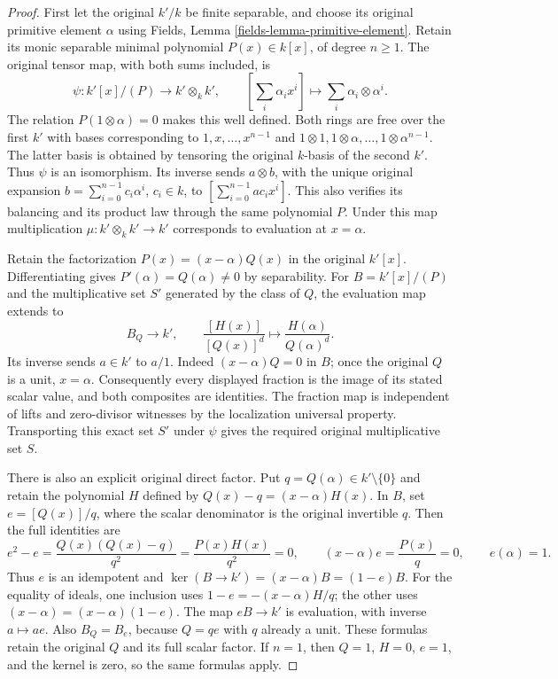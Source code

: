 \begin{proof}
First let the original $k'/k$ be finite
separable, and choose its original primitive
element $\alpha$ using Fields,
Lemma \ref{fields-lemma-primitive-element}.
Retain its monic separable minimal polynomial
$P(x)\in k[x]$, of degree $n\geq1$.
The original tensor map, with both sums
included, is
$$
\psi:k'[x]/(P)\longrightarrow k'\otimes_kk',
\qquad
\left[\sum_i\alpha_i x^i\right]
\longmapsto\sum_i\alpha_i\otimes\alpha^i.
$$
The relation $P(1\otimes\alpha)=0$ makes this
well defined. Both rings are free over the
first $k'$ with bases corresponding to
$1,x,\ldots,x^{n-1}$ and
$1\otimes1,1\otimes\alpha,\ldots,1\otimes\alpha^{n-1}$.
The latter basis is obtained by tensoring
the original $k$-basis of the second $k'$.
Thus $\psi$ is an isomorphism. Its inverse
sends $a\otimes b$, with the unique original
expansion $b=\sum_{i=0}^{n-1}c_i\alpha^i$,
$c_i\in k$, to $[\sum_{i=0}^{n-1}ac_i x^i]$.
This also verifies its balancing and its
product law through the same polynomial $P$.
Under this map multiplication
$\mu:k'\otimes_kk'\to k'$ corresponds to
evaluation at $x=\alpha$.

Retain the factorization $P(x)=(x-\alpha)Q(x)$
in the original $k'[x]$. Differentiating gives
$P'(\alpha)=Q(\alpha)\ne0$ by separability.
For $B=k'[x]/(P)$ and the multiplicative set
$S'$ generated by the class of $Q$, the
evaluation map extends to
$$
B_Q\longrightarrow k',\qquad
\frac{[H(x)]}{[Q(x)]^d}\longmapsto
\frac{H(\alpha)}{Q(\alpha)^d}.
$$
Its inverse sends $a\in k'$ to $a/1$.
Indeed $(x-\alpha)Q=0$ in $B$; once the
original $Q$ is a unit, $x=\alpha$.
Consequently every displayed fraction is
the image of its stated scalar value,
and both composites are identities. The
fraction map is independent of lifts and
zero-divisor witnesses by the localization
universal property. Transporting this exact
set $S'$ under $\psi$ gives the required
original multiplicative set $S$.

There is also an explicit original direct
factor. Put $q=Q(\alpha)\in k'\setminus\{0\}$
and retain the polynomial $H$ defined by
$Q(x)-q=(x-\alpha)H(x)$. In $B$, set
$e=[Q(x)]/q$, where the scalar denominator
is the original invertible $q$.
Then the full identities are
$$
e^2-e=\frac{Q(x)(Q(x)-q)}{q^2}
=\frac{P(x)H(x)}{q^2}=0,
\qquad (x-\alpha)e=\frac{P(x)}q=0,
\qquad e(\alpha)=1.
$$
Thus $e$ is an idempotent and
$\ker(B\to k')=(x-\alpha)B=(1-e)B$.
For the equality of ideals, one inclusion
uses $1-e=-(x-\alpha)H/q$; the other uses
$(x-\alpha)=(x-\alpha)(1-e)$.
The map $eB\to k'$ is evaluation, with
inverse $a\mapsto ae$. Also $B_Q=B_e$,
because $Q=qe$ with $q$ already a unit.
These formulas retain the original $Q$
and its full scalar factor. If $n=1$,
then $Q=1$, $H=0$, $e=1$, and the kernel
is zero, so the same formulas apply.


\end{proof}
